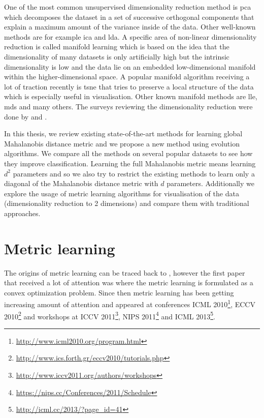 \documentclass[12pt,a4paper]{report}
\begin{document}
One of the most common unsupervised dimensionality reduction method is \ac{pca} \citep{jolliffe2002principal} which decomposes the dataset in a set of successive orthogonal components that explain a maximum amount of the variance inside of the data. Other well-known methods are for example \ac{ica} and \ac{lda}. A specific area of non-linear dimensionality reduction is called manifold learning which is based on the idea that the dimensionality of many datasets is only artificially high but the intrinsic dimensionality is low and the data lie on an embedded low-dimensional manifold within the higher-dimensional space. A popular manifold algorithm receiving a lot of traction recently is \ac{tsne} \citep{maaten2008visualizing} that tries to preserve a local structure of the data which is especially useful in visualisation. Other known manifold methods are \ac{lle}, \ac{mds} and many others. The surveys reviewing the dimensionality reduction were done by \cite{fodor2002survey} and \cite{van2009dimensionality}.

In this thesis, we review existing state-of-the-art methods for learning global Mahalanobis distance metric and we propose a new method using evolution algorithms. We compare all the methods on several popular datasets to see how they improve classification. Learning the full Mahalanobis metric means learning $d^2$ parameters and so we also try to restrict the existing methods to learn only a diagonal of the Mahalanobis distance metric with $d$ parameters. Additionally we explore the usage of metric learning algorithms for visualisation of the data (dimensionality reduction to 2 dimensions) and compare them with traditional approaches.

\section{Metric learning} \label{chap:intro:ml}

The origins of metric learning can be traced back to \cite{short1981optimal}, however the first paper that received a lot of attention was \cite{xing2002distance} where the metric learning is formulated as a convex optimization problem. Since then metric learning has been getting increasing amount of attention and appeared at conferences ICML 2010\footnote{\url{http://www.icml2010.org/program.html}}, ECCV 2010\footnote{\url{http://www.ics.forth.gr/eccv2010/tutorials.php}} and workshops at ICCV 2011\footnote{\url{http://www.iccv2011.org/authors/workshops}}, NIPS 2011\footnote{\url{https://nips.cc/Conferences/2011/Schedule}} and ICML 2013\footnote{\url{http://icml.cc/2013/?page_id=41}}.
\end{document}
